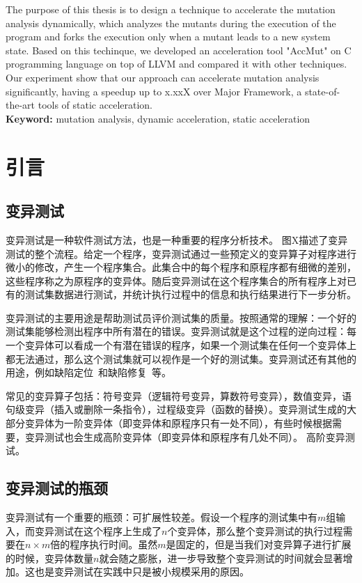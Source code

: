 \documentclass[nofonts]{ctexrep}
\begin{document}
The purpose of this thesis is to design a technique to accelerate the mutation analysis dynamically, which analyzes the mutants during the execution of the program and forks the execution only when a mutant leads to a new system state. Based on this techinque, we developed an acceleration tool "AccMut" on C programming language on top of LLVM and compared it with other techniques. Our experiment show that our approach can accelerate mutation analysis significantly, having a speedup up to x.xxX over Major Framework, a state-of-the-art tools of static acceleration. \\

\textbf{Keyword:} mutation analysis, dynamic acceleration, static acceleration
\tableofcontents


\chapter{引言}
\section{变异测试}
变异测试是一种软件测试方法，也是一种重要的程序分析技术\cite{demillo1978hints,hamlet1977testing}。
图X描述了变异测试的整个流程。给定一个程序，变异测试通过一些预定义的变异算子对程序进行微小的修改，产生一个程序集合。此集合中的每个程序和原程序都有细微的差别，这些程序称之为原程序的变异体。随后变异测试在这个程序集合的所有程序上对已有的测试集数据进行测试，并统计执行过程中的信息和执行结果进行下一步分析。


变异测试的主要用途是帮助测试员评价测试集的质量\cite{jia2011analysis}。按照通常的理解：一个好的测试集能够检测出程序中所有潜在的错误。变异测试就是这个过程的逆向过程：每一个变异体可以看成一个有潜在错误的程序，如果一个测试集在任何一个变异体上都无法通过，那么这个测试集就可以视作是一个好的测试集。变异测试还有其他的用途，例如缺陷定位~\cite{papadakis2012using,moon2014ask,zhang2013injecting}和缺陷修复~\cite{GenProg,PAR,RSRepair,AE}等。

常见的变异算子包括：符号变异（逻辑符号变异，算数符号变异），数值变异，语句级变异（插入或删除一条指令），过程级变异（函数的替换）。变异测试生成的大部分变异体为一阶变异体（即变异体和原程序只有一处不同），有些时候根据需要，变异测试也会生成高阶变异体（即变异体和原程序有几处不同）。
高阶变异测试。

\section{变异测试的瓶颈}
变异测试有一个重要的瓶颈：可扩展性较差。假设一个程序的测试集中有$m$组输入，而变异测试在这个程序上生成了$n$个变异体，那么整个变异测试的执行过程需要在$n\times m$倍的程序执行时间。虽然$m$是固定的，但是当我们对变异算子进行扩展的时候，变异体数量$n$就会随之膨胀，进一步导致整个变异测试的时间就会显著增加。这也是变异测试在实践中只是被小规模采用的原因。
\end{document}
